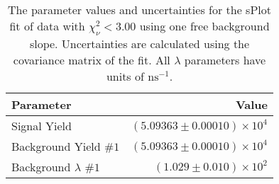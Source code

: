 
\begin{table}[ht]
    \begin{center}
        \begin{tabular}{lr}\toprule
            Parameter & Value \\\midrule
            Signal Yield & $(5.09363 \pm 0.00010) \times 10^{4}$ \\
            Background Yield $\#1$ & $(5.09363 \pm 0.00010) \times 10^{4}$ \\
            Background $\lambda$ $\#1$ & $(1.029 \pm 0.010) \times 10^{2}$ \\\bottomrule
        \end{tabular}
        \caption{The parameter values and uncertainties for the sPlot fit of data with $\chi^2_\nu < 3.00$ using one free background slope. Uncertainties are calculated using the covariance matrix of the fit. All $\lambda$ parameters have units of $\si{\nano\second}^{-1}$.}\label{tab:splot-fit-results-chisqdof-3.00-free-1}
    \end{center}
\end{table}
